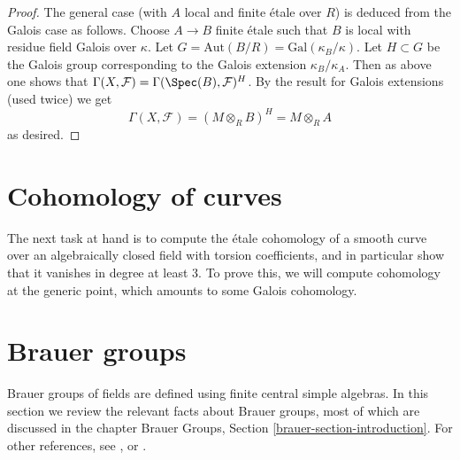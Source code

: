 \begin{proof}
\medskip\noindent
The general case (with $A$ local and finite \'etale over $R$)
is deduced from the Galois case as follows. Choose $A \to B$
finite \'etale such that $B$ is local with residue field
Galois over $\kappa$. Let $G = \text{Aut}(B/R) = \text{Gal}(\kappa_B/\kappa)$.
Let $H \subset G$ be the Galois group corresponding to the
Galois extension $\kappa_B/\kappa_A$. Then as above one
shows that $\Gamma(X, \mathcal{F}) = \Gamma(\Spec(B), \mathcal{F})^H$.
By the result for Galois extensions (used twice) we get
$$
\Gamma(X, \mathcal{F}) = (M \otimes_R B)^H = M \otimes_R A
$$
as desired.
\end{proof}

\section{Cohomology of curves}
\label{etale-cohomology-section-cohomology-curves}
The next task at hand is to compute the \'etale cohomology of a smooth curve
over an algebraically closed field with torsion coefficients, and in
particular show that it vanishes in degree at least 3. To prove this, we
will compute cohomology at the generic point, which
amounts to some Galois cohomology.

\section{Brauer groups}
\label{etale-cohomology-section-brauer-groups}
Brauer groups of fields are defined using finite central simple algebras.
In this section we review the relevant facts about Brauer groups, most of
which are discussed in the chapter
Brauer Groups, Section \ref{brauer-section-introduction}.
For other references, see \cite{SerreCorpsLocaux},
\cite{SerreGaloisCohomology} or \cite{Weil}.


